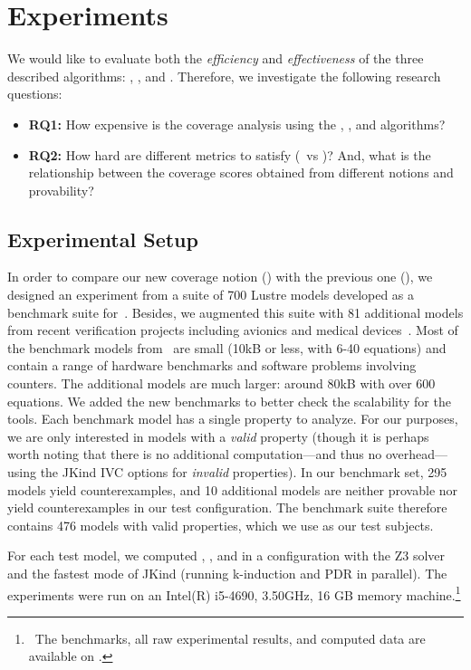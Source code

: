 \section{Experiments}
\label{sec:experiments}

We would like to evaluate both the {\em efficiency} and {\em
  effectiveness} of the three described algorithms: \ucbfalg, \ucalg, and \mustalg. Therefore, we investigate the following research questions:
\begin{itemize}
    \item \textbf{RQ1:} How expensive is the coverage analysis using the \ucalg, \mustalg, and \ucbfalg algorithms?
    \item \textbf{RQ2:} How hard are different metrics to satisfy (\ivccov\ vs \nondetcov)?  And, what is the relationship between the coverage scores obtained from different notions and provability?
\end{itemize}

\subsection{Experimental Setup}

In order to compare our new coverage notion (\ivccov) with the previous one (\nondetcov), we designed an experiment from a suite of 700 Lustre models developed
as a benchmark suite for~\cite{Hagen08:FMCAD}. Besides, we augmented this suite
with 81 additional models from recent verification projects including
avionics and medical devices~\cite{QFCS15:backes,hilt2013}. Most of
the benchmark models from~\cite{Hagen08:FMCAD} are small (10kB or less,
with 6-40 equations) and contain a range of hardware benchmarks and
software problems involving counters. The additional models are much
larger: around 80kB with over 600 equations. We added the new
benchmarks to better check the scalability for the tools. Each benchmark model has a single property to analyze.  For our purposes, we are only interested in models with a {\em valid} property (though it is perhaps worth noting that there is no additional computation---and thus no overhead---using the JKind IVC options for {\em invalid} properties).  In our benchmark set, 295 models yield counterexamples, and 10 additional models are neither provable nor yield counterexamples in our test configuration.  The benchmark suite therefore contains 476 models with valid properties, which we use as our test subjects.

For each test model, we computed \ucalg, \ucbfalg, and \mustalg in a configuration with
the Z3 solver and the fastest mode of JKind (running k-induction and PDR in parallel). The experiments
were run on an  Intel(R) i5-4690, 3.50GHz,
16 GB memory machine.\footnote{\noindent ~The benchmarks, all raw experimental results,
  and computed data are available on \cite{expr}.}




